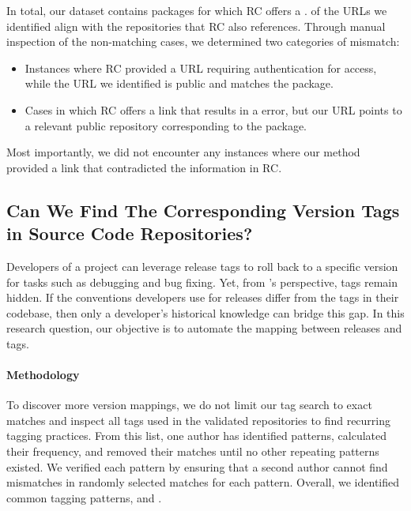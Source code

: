 \documentclass[smallextended]{svjour3}
\newcommand{\maven}[1]{\tool{Maven{#1}}}
\begin{document}
\begin{table}
\centering
\caption{Percentages of URL field usage and valid URLs for each}
\label{tab:urls}
\resizebox{\textwidth}{!}{%

}
\end{table}
In total, our dataset contains  packages for which RC offers a .  of the URLs we identified align with the repositories that RC also references. Through manual inspection of the  non-matching cases, we determined two categories of mismatch:
\begin{itemize}
    \item Instances where RC provided a URL requiring authentication for access, while the URL we identified is public and matches the package.
    \item Cases in which RC offers a link that results in a  error, but our URL points to a relevant public repository corresponding to the package.

\end{itemize}

Most importantly, we did not encounter any instances where our method provided a link that contradicted the information in RC.

\subsection{Can We Find The Corresponding Version Tags in Source Code Repositories?}

Developers of a project can leverage release tags to roll back to a specific version for tasks such as debugging and bug fixing. Yet, from \maven{}'s perspective, tags remain hidden. If the conventions developers use for \maven{} releases differ from the tags in their codebase, then only a developer's historical knowledge can bridge this gap. In this research question, our objective is to automate the mapping between \maven{} releases and  tags. 

\paragraph{Methodology}
\label{sec:tags-method}
To discover more version mappings, we do not limit our tag search to exact matches and inspect all tags used in the validated repositories to find recurring tagging practices. From this list, one author has identified patterns, calculated their frequency, and removed their matches until no other repeating patterns existed. We verified each pattern by ensuring that a second author cannot find mismatches in  randomly selected matches for each pattern. Overall, we identified  common tagging patterns, and .
\end{document}
